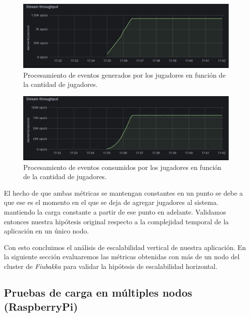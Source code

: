 \begin{figure}[htbp]
    \centering
    \includegraphics[width=1\textwidth]{../assets/stream-producer-amplified-metrics.png}
    \caption{Procesamiento de eventos generados por los jugadores en función de la cantidad de jugadores.}
\end{figure}

\newpage

\begin{figure}[htbp]
    \centering
    \includegraphics[width=1\textwidth]{../assets/stream-consumer-amplified-metrics.png}
    \caption{Procesamiento de eventos consumidos por los jugadores en función de la cantidad de jugadores.}
\end{figure}

El hecho de que ambas métricas se mantengan constantes en un punto se debe a que ese es el momento en el que se deja de agregar jugadores al sistema. mantiendo la carga
constante a partir de ese punto en adelante. Validamos entonces nuestra hipótesis original respecto a la complejidad temporal de la aplicación en un único nodo.

Con esto concluimos el análisis de escalabilidad vertical de nuestra aplicación. En la siguiente sección evaluaremos las métricas obtenidas
con más de un nodo del cluster de \textit{Fiubakka} para validar la hipótesis de escalabilidad horizontal.

\subsection{Pruebas de carga en múltiples nodos (RaspberryPi)}


